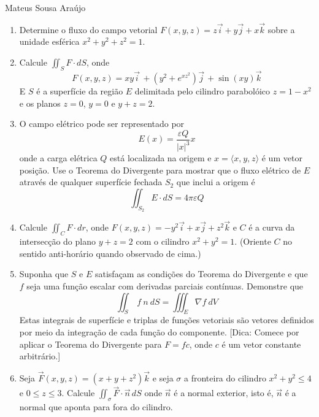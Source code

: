 \documentclass[11pt,a4paper]{article}
\begin{document}
	\begin{center}
		\Large Mateus Sousa Araújo 
	\end{center}
	

	\begin{enumerate}
	
	\item Determine o fluxo do campo vetorial $F(x,y,z) = z\vec{i} + y\vec{j} + x\vec{k}$ sobre a unidade esférica $x^2 + y^2 + z^2 = 1$.
	
	\item Calcule $\displaystyle\iint_S F \cdot dS$, onde 
	$$F(x,y,z) = xy\vec{i} \, + (y^2 + e^{xz^2})\vec{j} \, + \sin (xy)\vec{k}$$
	E $S$ é a superfície da região $E$ delimitada pelo cilindro parabolóico $z = 1 - x^2$ e os planos $z = 0$, $y = 0$ e $y + z = 2$.
	
	\item O campo elétrico pode ser representado por 
	$$E(x) = \displaystyle\dfrac{\varepsilon Q}{|x|^3} x $$
	onde a carga elétrica $Q$ está localizada na origem e $x = \langle x \textrm{,}\ y \textrm{,}\ z \rangle$ é um vetor posição. Use o Teorema do Divergente para mostrar que o fluxo elétrico de $E$ através de qualquer superfície fechada $S_2$ que inclui a origem é
	$$\displaystyle\iint_{S_2} E \cdot dS = 4 \pi \varepsilon Q$$
	
	\item Calcule $\displaystyle\iint_C F \cdot dr$, onde $F(x,y,z) = -y^2\vec{i} + x\vec{j} + z^2\vec{k}$ e $C$ é a curva da intersecção do plano $y + z = 2$ com o cilindro $x^2 + y^2 = 1$. (Oriente $C$ no sentido anti-horário quando observado de cima.)
	
	
	
	\item Suponha que $S$ e $E$ satisfaçam as condições do Teorema do Divergente e que $f$ seja uma função escalar com derivadas parciais contínuas. Demonstre que
	$$\displaystyle\iint_S \ f \ n \ dS = \displaystyle\iiint_E \nabla f \ dV$$
	Estas integrais de superfície e triplas de funções vetoriais são vetores definidos por meio da integração de cada função do componente. [Dica: Comece por aplicar o Teorema do Divergente para $F = fc$, onde $c$ é um vetor constante arbitrário.]
	
	\item Seja $\vec{F}(x,y,z) = (x + y + z^2)\vec{k}$ e seja $\sigma$ a fronteira do cilindro $x^2 + y^2 \leq 4$ e $0 \leq z \leq 3$. Calcule $\displaystyle\iint_\sigma \vec{F} \cdot \vec{n} \, dS$ onde $\vec{n}$ é a normal exterior, isto é, $\vec{n}$ é a normal que aponta para fora do cilindro. 
 

\end{enumerate}
\end{document}
